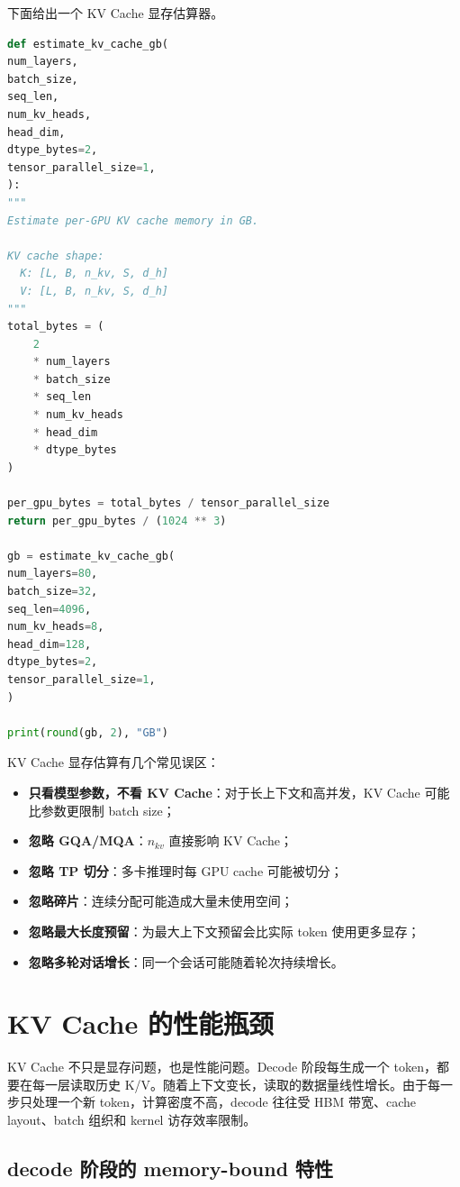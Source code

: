 下面给出一个 KV Cache 显存估算器。

\begin{lstlisting}[language=Python,caption={KV Cache 显存估算器},label={lst:kv-cache-memory-estimator}]
def estimate_kv_cache_gb(
num_layers,
batch_size,
seq_len,
num_kv_heads,
head_dim,
dtype_bytes=2,
tensor_parallel_size=1,
):
"""
Estimate per-GPU KV cache memory in GB.

KV cache shape:
  K: [L, B, n_kv, S, d_h]
  V: [L, B, n_kv, S, d_h]
"""
total_bytes = (
    2
    * num_layers
    * batch_size
    * seq_len
    * num_kv_heads
    * head_dim
    * dtype_bytes
)

per_gpu_bytes = total_bytes / tensor_parallel_size
return per_gpu_bytes / (1024 ** 3)

gb = estimate_kv_cache_gb(
num_layers=80,
batch_size=32,
seq_len=4096,
num_kv_heads=8,
head_dim=128,
dtype_bytes=2,
tensor_parallel_size=1,
)

print(round(gb, 2), "GB")
\end{lstlisting}

KV Cache 显存估算有几个常见误区：

\begin{itemize}
\item \textbf{只看模型参数，不看 KV Cache}：对于长上下文和高并发，KV Cache 可能比参数更限制 batch size；
\item \textbf{忽略 GQA/MQA}：$n_{kv}$ 直接影响 KV Cache；
\item \textbf{忽略 TP 切分}：多卡推理时每 GPU cache 可能被切分；
\item \textbf{忽略碎片}：连续分配可能造成大量未使用空间；
\item \textbf{忽略最大长度预留}：为最大上下文预留会比实际 token 使用更多显存；
\item \textbf{忽略多轮对话增长}：同一个会话可能随着轮次持续增长。
\end{itemize}

\section{KV Cache 的性能瓶颈}
\label{sec:kv-cache-performance-bottlenecks}

KV Cache 不只是显存问题，也是性能问题。Decode 阶段每生成一个 token，都要在每一层读取历史 K/V。随着上下文变长，读取的数据量线性增长。由于每一步只处理一个新 token，计算密度不高，decode 往往受 HBM 带宽、cache layout、batch 组织和 kernel 访存效率限制。

\subsection{decode 阶段的 memory-bound 特性}
\label{subsec:decode-memory-bound}

